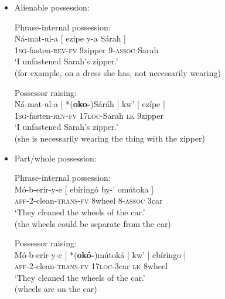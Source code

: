 \documentclass[output=paper]{langscibook}
\begin{document}
\begin{itemize}
    \item Alienable possession:
    
\ea \label{ex:schneider:alienablepossession}
\begin{xlist}

\ex \label{ex:schneider:phrasealienable}
Phrase-internal possession: \\
\gll Ná-mat-ul-a [ ezípe y-a Sárah ]\\
\textsc{1sg}-fasten-\textsc{rev-fv} {} 9zipper 9-\textsc{assoc} Sarah {}\\
\glt  `I unfastened Sarah's zipper.'\\
(for example, on a dress she has, not necessarily wearing)

\ex \label{ex:schneider:raisingalienable}
Possessor raising:\\
\gll Ná-mat-ul-a [ *(\textbf{oko-})Sáráh ] kw' [ ezípe ]\\
\textsc{1sg}-fasten-\textsc{rev-fv} {} \textsc{17loc-}Sarah {} \textsc{lk} {} 9zipper {} \\
\glt  `I unfastened Sarah's zipper.'\\
(she is necessarily wearing the thing with the zipper)

\end{xlist}
\z

    \item Part/whole possession:
    
\ea \label{ex:schneider:partwholepossession}
\begin{xlist}

\ex \label{ex:schneider:partwholephrase}
Phrase-internal possession:\\
\gll M\'o-b-erír-y-e [ ebíring\'o by-' omútoka ]\\
\textsc{aff-}2-clean-\textsc{trans-fv} {} 8wheel 8-\textsc{assoc} 3car {} \\
\glt  `They cleaned the wheels of the car.'\\
(the wheels could be separate from the car)

\ex \label{ex:schneider:partwholeraising}
Possessor raising: \\
\gll M\'o-b-erír-y-e  [ *(\textbf{ok\'o-})mútoká ]  kw' [ ebíríngo ]\\
\textsc{aff-}2-clean-\textsc{trans-fv} {} \textsc{17loc-}3car {} \textsc{lk} {} 8wheel {} \\
\glt  `They cleaned the wheels of the car.'\\
(wheels are on the car)

\end{xlist}
\z
\end{itemize} 
\end{document}

